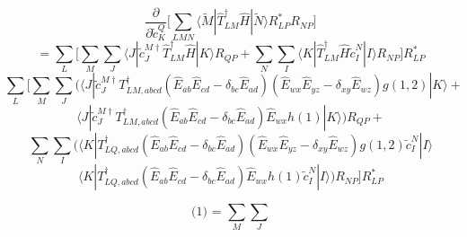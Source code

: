 \documentclass[12pt]{article}
\begin{document}
\begin{equation*}
\frac{\partial}{\partial \tilde{c}^{Q}_{K}}\Bigg[ \sum_{LMN}\langle \tilde{M}|\hat{T}_{LM}^{\dagger}\hat{H}|\tilde{N}\rangle R_{LP}^{*}R_{NP}\Bigg] 
\end{equation*}
\begin{equation*}
=\sum_{L} \Bigg[
\sum_{M}\sum_{J} \langle J |\tilde{c}^{M\dagger}_{J}\hat{T}_{LM}^{\dagger}\hat{H}|K\rangle R_{QP}+
\sum_{N}\sum_{I} \langle K |\hat{T}_{LM}^{\dagger}\hat{H}\tilde{c}^{N}_{I}|I\rangle R_{NP}\Bigg]R^{*}_{LP}
\end{equation*}
\begin{equation}
\sum_{L} \Bigg[
\sum_{M}\sum_{J} 
\Big(\langle J |\tilde{c}^{M\dagger}_{J} T_{LM,abcd}^{\dagger}(\hat{E}_{ab}\hat{E}_{cd}-\delta_{bc}\hat{E}_{ad})(\hat{E}_{wx}\hat{E}_{yz}-\delta_{xy}\hat{E}_{wz})g(1,2)|K\rangle+
\end{equation}
\begin{equation}
\langle J |\tilde{c}^{M\dagger}_{J} T_{LM,abcd}^{\dagger}(\hat{E}_{ab}\hat{E}_{cd}-\delta_{bc}\hat{E}_{ad})\hat{E}_{wx}h(1)|K\rangle\Big) R_{QP}+
\end{equation}
\begin{equation}
\sum_{N}\sum_{I} \Big(
\langle K | T_{LQ,abcd}^{\dagger}(\hat{E}_{ab}\hat{E}_{cd}-\delta_{bc}\hat{E}_{ad})(\hat{E}_{wx}\hat{E}_{yz}-\delta_{xy}\hat{E}_{wz})g(1,2)\tilde{c}^{N}_{I}|I\rangle 
\end{equation}
\begin{equation}
\langle K | T_{LQ,abcd}^{\dagger}(\hat{E}_{ab}\hat{E}_{cd}-\delta_{bc}\hat{E}_{ad})\hat{E}_{wx}h(1)\tilde{c}^{N}_{I}|I\rangle\Big) R_{NP}\Bigg]R^{*}_{LP}
\end{equation}


\begin{equation*}
\text{(1) = }  \sum_{M}\sum_{J} 
\end{equation*}
\end{document}
